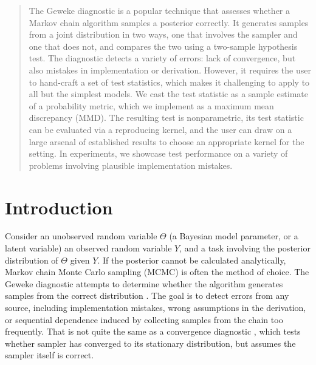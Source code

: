 \documentclass{article}
\begin{document}
\begin{abstract}
The Geweke diagnostic is a popular technique that assesses whether a Markov chain
  algorithm samples a posterior correctly. It
  generates samples from a joint distribution in two ways,
  one that involves the sampler and one that does not, and compares
  the two using a two-sample hypothesis test. 
  The diagnostic detects a variety of errors: lack of
  convergence, but also mistakes in implementation or derivation.
  However, it requires the user to hand-craft a set of test statistics, which makes it 
  challenging to apply to all but the simplest models.
  We cast the test statistic as a sample estimate of a probability metric, which we implement as a maximum mean discrepancy (MMD).
The resulting test is nonparametric, its test statistic can be evaluated via a reproducing kernel, and the user can draw on a large arsenal of established results to choose an appropriate kernel for the setting.
  In experiments, we showcase test performance on a variety of problems involving plausible implementation mistakes.
\end{abstract}  


\section{Introduction}
\label{section:intro}

Consider an unobserved
random variable $\Theta$ (a Bayesian model parameter, or a latent variable)
an observed random variable $Y$, and a task involving the
posterior distribution of $\Theta$ given $Y$. If the posterior cannot
be calculated analytically, Markov chain Monte Carlo sampling
(MCMC) is often the method of choice.
The Geweke diagnostic attempts to determine
whether the algorithm generates samples from the correct distribution
\cite{geweke_getting_2004}.
The goal is to detect errors from any source, including 
implementation mistakes, wrong assumptions in the
derivation, or sequential dependence induced by collecting samples from the chain too
frequently.
That is not quite the same as a convergence diagnostic \citep[see e.g.][]{robert_short_2011}, which tests whether
sampler has converged to its stationary distribution, but assumes the sampler itself
is correct.
\end{document}

